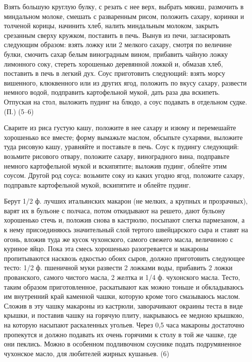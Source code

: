 
Взять большую круглую булку, с резать с нее верх, выбрать мякиш, размочить в миндальном молоке, смешать с разваренным рисом, положить сахару, коринки и толченой корицы, начинить хлеб, налить миндальным молоком, закрыть срезанным сверху кружком, поставить в печь. Вынув из печи, загласировать следующим образом: взять ложку или 2 мелкого сахару, смотря по величине булки, смочить сахар белым виноградным вином, прибавить чайную ложку лимонного соку, стереть хорошенько деревянной ложкой и, обмазав хлеб, поставить в печь в легкий дух. Соус приготовить следующий: взять морсу вишенного, клюквенного или из других ягод, положить по вкусу сахару, развести немного водой, подправить картофельной мукой, дать раза два вскипеть. Отпуская на стол, выложить пудинг на блюдо, а соус подавать в отдельном судке. (П.) (5--6) 


Сварите из риса густую кашу, положите в нее сахару и изюму и перемешайте хорошенько все вместе; форму вымажьте маслом, обсыпьте сухарями, выложите туда рисовую кашу, уравняйте и поставьте в печь. Соус к пудингу следующий: возьмите рисового отвару, положите сахару, виноградного вина, подправьте немного картофельной мукой и вскипятите; выложив пудинг, облейте этим соусом. Другой род соуса: возьмите соку из каких угодно ягод, положите сахару, подправьте картофельной мукой, вскипятите и облейте пудинг. 


Берут 1/2 ф. лучших итальянских макарон (не мелких, а крупных и прозрачных), варят их в бульоне с полчаса, потом откидывают на решето, дают бульону хорошенько стечь и, положив снова в кастрюлю, посыпают слегка пармезаном, а к нему присоединяюсь значительный слой тертого швейцарского сыра и ставят на огонь, вложив туда же кусок чухонского, самого свежего масла, величиною с куриное яйцо. Пока эта смесь хорошенько разогревается и макароны пропитываются насквозь едкостью обоих сыров, должно приготовить следующее тесто: 1/2 ф. пшеничной муки развести 2 ложками воды, прибавить 2 ложки прованского, самого чистого масла, 2 желтка и 1/4 ф. чухонского масла. Тесто, таким образом приготовленное, раскатывают как можно тоньше и обкладываюсь им внутренний край каменной чашки, которую кроме того смазываюсь маслом. Сложив в эту чашку макароны из кастрюли, заворачивают окраины теста в виде крышки, и поставив чашку на горячую плиту, накрываюсь ее медною крышкою, на которую насыпают раскаленных угольев. Через 0,5 часа макароны достаточно пропекутся и должно подавать их очень горячими к столу в той же чашке, где они пеклись. Можно в особенном подливочном соуснике подать подрумяненное чухонское масло, для любителей жирных кушаньев. (6) 

